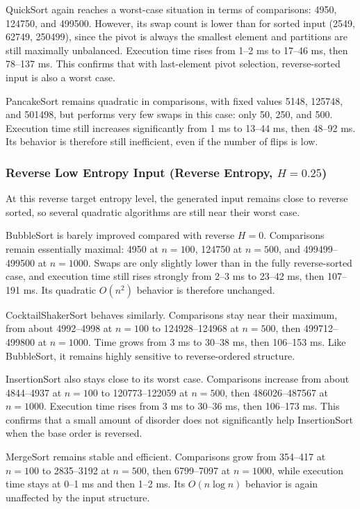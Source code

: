 \documentclass{article}
\begin{document}
QuickSort again reaches a worst-case situation in terms of comparisons: 4950, 124750, and 499500. However, its swap count is lower than for sorted input (2549, 62749, 250499), since the pivot is always the smallest element and partitions are still maximally unbalanced. Execution time rises from 1--2 ms to 17--46 ms, then 78--137 ms. This confirms that with last-element pivot selection, reverse-sorted input is also a worst case.

PancakeSort remains quadratic in comparisons, with fixed values 5148, 125748, and 501498, but performs very few swaps in this case: only 50, 250, and 500. Execution time still increases significantly from 1 ms to 13--44 ms, then 48--92 ms. Its behavior is therefore still inefficient, even if the number of flips is low.


\subsubsection{Reverse Low Entropy Input (Reverse Entropy, $H = 0.25$)}

At this reverse target entropy level, the generated input remains close to reverse sorted, so several quadratic algorithms are still near their worst case.

BubbleSort is barely improved compared with reverse $H=0$. Comparisons remain essentially maximal: 4950 at $n=100$, 124750 at $n=500$, and 499499--499500 at $n=1000$. Swaps are only slightly lower than in the fully reverse-sorted case, and execution time still rises strongly from 2--3 ms to 23--42 ms, then 107--191 ms. Its quadratic $O(n^2)$ behavior is therefore unchanged.

CocktailShakerSort behaves similarly. Comparisons stay near their maximum, from about 4992--4998 at $n=100$ to 124928--124968 at $n=500$, then 499712--499800 at $n=1000$. Time grows from 3 ms to 30--38 ms, then 106--153 ms. Like BubbleSort, it remains highly sensitive to reverse-ordered structure.

InsertionSort also stays close to its worst case. Comparisons increase from about 4844--4937 at $n=100$ to 120773--122059 at $n=500$, then 486026--487567 at $n=1000$. Execution time rises from 3 ms to 30--36 ms, then 106--173 ms. This confirms that a small amount of disorder does not significantly help InsertionSort when the base order is reversed.

MergeSort remains stable and efficient. Comparisons grow from 354--417 at $n=100$ to 2835--3192 at $n=500$, then 6799--7097 at $n=1000$, while execution time stays at 0--1 ms and then 1--2 ms. Its $O(n \log n)$ behavior is again unaffected by the input structure.
\end{document}
